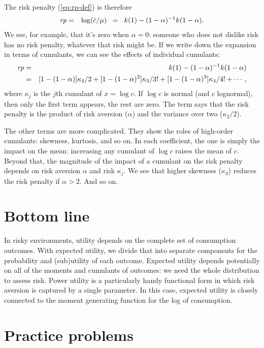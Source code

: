 The risk penalty (\ref{eq:rp-def}) is therefore
\begin{eqnarray*}
    \mbox{\em rp\/} &=& \log (\bar{c}/\mu)  \;\;=\;\; k(1) - (1-\alpha)^{-1} k(1-\alpha) .
\end{eqnarray*}
We see, for example, that it's zero when $\alpha = 0$:
someone who does not dislike risk has no risk penalty,
whatever that risk might be.
If we write down the expansion in terms of cumulants,
we can see the effects of individual cumulants:
\begin{eqnarray}
    \mbox{\em rp\/} &=& k(1) - (1-\alpha)^{-1} k(1-\alpha) \nonumber \\
        &=& [1-(1-\alpha)] \kappa_2/2 + [1- (1-\alpha)^2] \kappa_3/3!
            + [1- (1-\alpha)^3] \kappa_4/4! + \cdots ,
        \label{eq:rp-cum-expansion}
\end{eqnarray}
where $\kappa_j$ is the $j$th cumulant of $x = \log c$.
If $\log c$ is normal (and $c$ lognormal), then only the first term appears,
the rest are zero.
The term says that the risk penalty is the product of risk aversion ($\alpha$)
and the variance over two ($\kappa_2/2$).

The other terms are more complicated.
They show the roles of high-order cumulants:  skewness, kurtosis, and so on.
In each coefficient, the one is simply the impact on the mean:
increasing any cumulant of $\log c$ raises the mean of $c$.
Beyond that, the magnitude of the impact of a cumulant
on the risk penalty depends on risk aversion $\alpha$ and risk $\kappa_j$.
We see that higher skewness ($\kappa_3$) reduces the risk penalty if $\alpha > 2$.
And so on.


\section*{Bottom line}

In risky environments, utility depends
on the complete set of consumption outcomes.
With expected utility, we divide that into separate components
for the probability and (sub)utility of each outcome.
Expected utility depends potentially on all of the moments and cumulants
of outcomes:
we need the whole distribution to assess risk.
Power utility is a particularly handy functional form
in which risk aversion is captured by a single parameter.
In this case, expected utility is closely connected to the
moment generating function for the log of consumption.

\section*{Practice problems}

